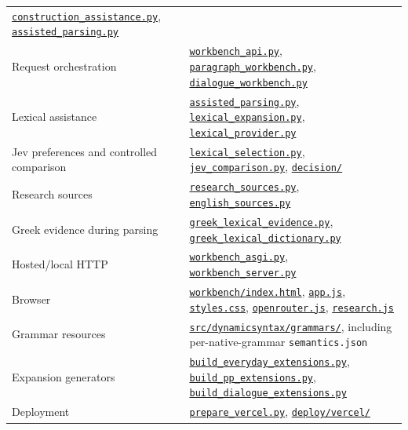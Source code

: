 \documentclass[11pt,a4paper]{article}
\begin{document}
\begin{longtable}[]{@{}
  >{\raggedright\arraybackslash}p{}
  >{\raggedright\arraybackslash}p{}@{}}
\href{../src/dylan/construction_assistance.py}{\nolinkurl{construction_assistance.py}},
\href{../src/dylan/assisted_parsing.py}{\nolinkurl{assisted_parsing.py}} \\
Request orchestration &
\href{../src/dylan/workbench_api.py}{\texttt{workbench\_api.py}},
\href{../src/dylan/paragraph_workbench.py}{\nolinkurl{paragraph_workbench.py}},
\href{../src/dylan/dialogue_workbench.py}{\nolinkurl{dialogue_workbench.py}} \\
Lexical assistance &
\href{../src/dylan/assisted_parsing.py}{\nolinkurl{assisted_parsing.py}},
\href{../src/dylan/lexical_expansion.py}{\nolinkurl{lexical_expansion.py}},
\href{../src/dylan/lexical_provider.py}{\nolinkurl{lexical_provider.py}} \\
Jev preferences and controlled comparison &
\href{../src/dylan/lexical_selection.py}{\nolinkurl{lexical_selection.py}},
\href{../src/dylan/jev_comparison.py}{\nolinkurl{jev_comparison.py}},
\href{../src/dylan/decision}{\nolinkurl{decision/}} \\
Research sources &
\href{../src/dylan/research_sources.py}{\nolinkurl{research_sources.py}},
\href{../src/dylan/english_sources.py}{\nolinkurl{english_sources.py}} \\
Greek evidence during parsing &
\href{../src/dylan/greek_lexical_evidence.py}{\nolinkurl{greek_lexical_evidence.py}},
\href{../src/dylan/greek_lexical_dictionary.py}{\nolinkurl{greek_lexical_dictionary.py}} \\
Hosted/local HTTP &
\href{../src/dylan/workbench_asgi.py}{\nolinkurl{workbench_asgi.py}},
\href{../src/dylan/workbench_server.py}{\nolinkurl{workbench_server.py}} \\
Browser &
\href{../workbench/index.html}{\nolinkurl{workbench/index.html}},
\href{../workbench/app.js}{\texttt{app.js}},
\href{../workbench/styles.css}{\texttt{styles.css}},
\href{../workbench/openrouter.js}{\texttt{openrouter.js}},
\href{../workbench/research.js}{\texttt{research.js}} \\
Grammar resources &
\href{../src/dynamicsyntax/grammars}{\nolinkurl{src/dynamicsyntax/grammars/}},
including per-native-grammar \texttt{semantics.json} \\
Expansion generators &
\href{../scripts/build_everyday_extensions.py}{\nolinkurl{build_everyday_extensions.py}},
\href{../scripts/build_pp_extensions.py}{\nolinkurl{build_pp_extensions.py}},
\href{../scripts/build_dialogue_extensions.py}{\nolinkurl{build_dialogue_extensions.py}} \\
Deployment &
\href{../scripts/prepare_vercel.py}{\nolinkurl{prepare_vercel.py}},
\href{../deploy/vercel}{\nolinkurl{deploy/vercel/}} \\
\end{longtable}
\end{document}
